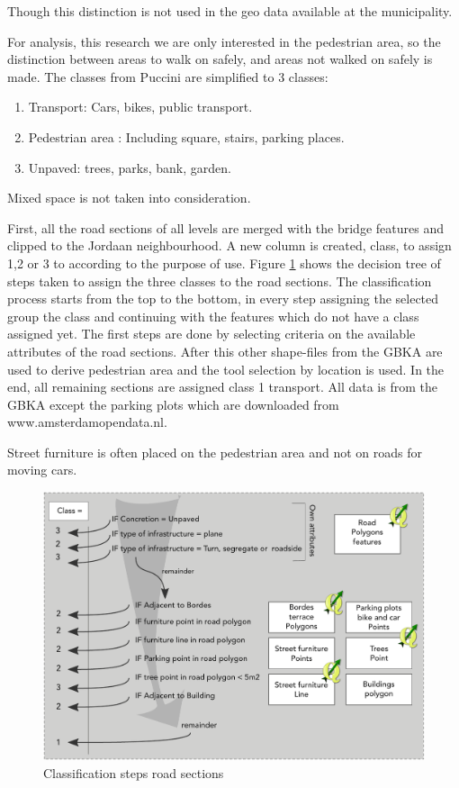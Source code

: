 Though this distinction is not used in the geo data available at the municipality.

For analysis, this research we are only interested in the pedestrian area, so the distinction between areas to walk on safely, and areas not walked on safely is made. The classes from Puccini are simplified to 3 classes:
\begin{enumerate}
\item Transport: Cars, bikes, public transport. 
\item Pedestrian area : Including square, stairs, parking places. 
\item Unpaved: trees, parks, bank, garden.
\end{enumerate}
Mixed space is not taken into consideration.

First, all the road sections of all levels are merged with the bridge features and clipped to the Jordaan neighbourhood. A new column is created, class, to assign 1,2 or 3 to according to the purpose of use. 
Figure \ref{classRoad} shows the decision tree of steps taken to assign the three classes to the road sections. The classification process starts from the top to the bottom, in every step assigning the selected group the class and continuing with the features which do not have a class assigned yet. The first steps are done by selecting criteria on the available attributes of the road sections. After this other shape-files from the GBKA are used to derive pedestrian area and the tool selection by location is used. In the end, all remaining sections are assigned class 1 transport. All data is from the GBKA except the parking plots which are downloaded from www.amsterdamopendata.nl. 

Street furniture is often placed on the pedestrian area and not on roads for moving cars. 

\begin{figure}[ht]
\includegraphics[width=\textwidth]{img/M_Pedestrianareaclassification.pdf}
\centering
\caption{ Classification steps road sections\label{classRoad}}
\end{figure}


